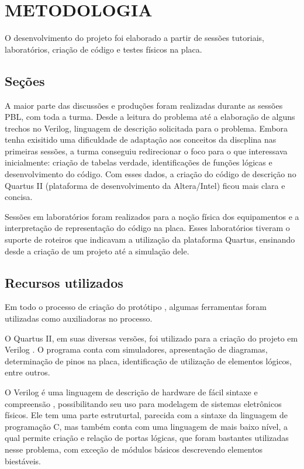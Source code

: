 \chapter{METODOLOGIA}

O desenvolvimento do projeto foi elaborado a partir de sessões tutoriais, laboratórios, criação de código e testes físicos na placa.

\section{Seções}
A maior parte das discussões e produções foram realizadas durante as sessões PBL, com toda a turma. Desde a leitura do problema até a elaboração de alguns trechos no Verilog, linguagem de descrição solicitada para o problema. Embora tenha exisitido uma dificuldade de adaptação aos conceitos da discplina nas primeiras sessões, a turma conseguiu redirecionar o foco para o que interessava inicialmente: criação de tabelas verdade, identificações de funções lógicas e desenvolvimento do código. Com esses dados, a criação do código de descrição no Quartus II (plataforma de desenvolvimento da Altera/Intel) ficou mais clara e concisa.

Sessões em laboratórios foram realizados para a noção física dos equipamentos e a interpretação de representação do código na placa. Esses laboratórios tiveram o suporte de roteiros que indicavam a utilização da plataforma Quartus, ensinando desde a criação de um projeto até a simulação dele.

\section{Recursos utilizados}
Em todo o processo de criação do protótipo , algumas ferramentas foram utilizadas como auxiliadoras no processo.

O Quartus II, em suas diversas versões, foi utilizado para a criação do projeto em Verilog \cite{weberarquitetura}. O programa conta com simuladores, apresentação de diagramas, determinação de pinos na placa, identificação de utilização de elementos lógicos, entre outros.

O Verilog é uma linguagem de descrição de hardware de fácil sintaxe e compreensão \cite{palnitkar2003verilog}, possibilitando seu uso para modelagem de sistemas eletrônicos físicos. Ele tem uma parte estruturtal, parecida com a sintaxe da linguagem de programação C, mas também conta com uma linguagem de mais baixo nível, a qual permite criação e relação de portas lógicas, que foram bastantes utilizadas nesse problema, com exceção de módulos básicos descrevendo elementos biestáveis.

